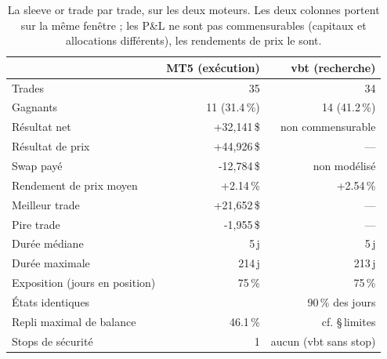 \begin{table}[H]
\centering
\begin{tabular}{@{}lrr@{}}
\toprule
 & \textbf{MT5 (exécution)} & \textbf{vbt (recherche)} \\
\midrule
Trades & 35 & 34 \\
Gagnants & 11 (31.4\,\%) & 14 (41.2\,\%) \\
Résultat net & +32,141\,\$ & non commensurable \\
Résultat de prix & +44,926\,\$ & --- \\
Swap payé & -12,784\,\$ & non modélisé \\
Rendement de prix moyen & +2.14\,\% & +2.54\,\% \\
Meilleur trade & +21,652\,\$ & --- \\
Pire trade & -1,955\,\$ & --- \\
Durée médiane & 5\,j & 5\,j \\
Durée maximale & 214\,j & 213\,j \\
Exposition (jours en position) & 75\,\% & 75\,\% \\
États identiques & \multicolumn{2}{r}{90\,\% des jours} \\
Repli maximal de balance & 46.1\,\% & cf. \S\,limites \\
Stops de sécurité & 1 & aucun (vbt sans stop) \\
\bottomrule
\end{tabular}
\caption{La sleeve or trade par trade, sur les deux moteurs. Les deux colonnes portent sur la même fenêtre ; les P\&L ne sont pas commensurables (capitaux et allocations différents), les rendements de prix le sont.}
\end{table}
